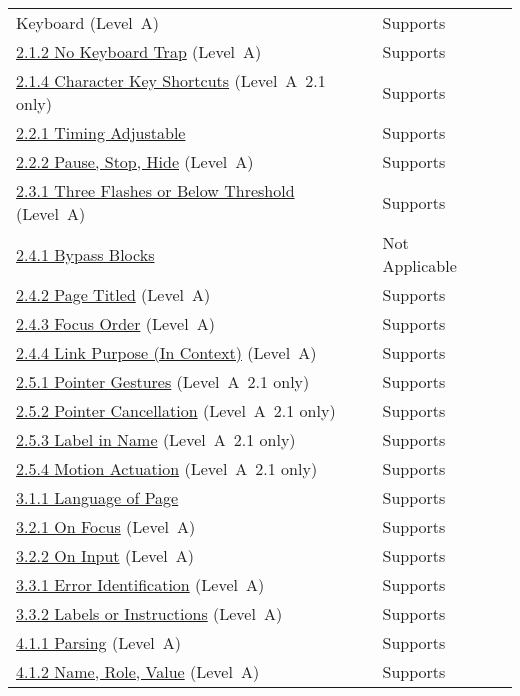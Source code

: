 \documentclass{report}
\begin{document}
\begin{longtable}{p{}<{\RaggedRight}p{}<{\RaggedRight}p{}<{\RaggedRight}}
{  Keyboard} (Level~A) & Supports \\
  \href{http://www.w3.org/TR/WCAG20/#keyboard-operation-trapping}{2.1.2
  No Keyboard Trap} (Level~A) & Supports \\
  \href{https://www.w3.org/TR/WCAG21/#character-key-shortcuts}{2.1.4
  Character Key Shortcuts} (Level~A~2.1 only) & Supports \\
        \href{http://www.w3.org/TR/WCAG20/#time-limits-required-behaviors}{2.2.1
  Timing Adjustable} & Supports\\
  \href{http://www.w3.org/TR/WCAG20/#time-limits-pause}{2.2.2 Pause, Stop,
  Hide} (Level~A) & Supports\\
  \href{http://www.w3.org/TR/WCAG20/#seizure-does-not-violate}{2.3.1
  Three Flashes or Below Threshold} (Level~A) & Supports\\
  \href{http://www.w3.org/TR/WCAG20/#navigation-mechanisms-skip}{2.4.1
  Bypass Blocks} & Not Applicable\\
  \href{http://www.w3.org/TR/WCAG20/#navigation-mechanisms-title}{2.4.2 Page Titled} (Level~A) & Supports\\
  \href{http://www.w3.org/TR/WCAG20/#navigation-mechanisms-focus-order}{2.4.3 Focus Order} (Level~A) & Supports\\
  \href{http://www.w3.org/TR/WCAG20/#navigation-mechanisms-refs}{2.4.4 Link Purpose (In Context)} (Level~A) & Supports\\
  \href{https://www.w3.org/TR/WCAG21/#pointer-gestures}{2.5.1 Pointer Gestures} (Level~A~2.1 only) & Supports\\
  \href{https://www.w3.org/TR/WCAG21/#pointer-cancellation}{2.5.2
  Pointer Cancellation} (Level~A~2.1 only) &  Supports\\
  \href{https://www.w3.org/TR/WCAG21/#label-in-name}{2.5.3 Label in Name} (Level~A~2.1 only) & Supports\\
  \href{https://www.w3.org/TR/WCAG21/#motion-actuation}{2.5.4 Motion Actuation} (Level~A~2.1 only) & Supports\\
  \href{http://www.w3.org/TR/WCAG20/#meaning-doc-lang-id}{3.1.1 Language of Page} & Supports\\
  \href{http://www.w3.org/TR/WCAG20/#consistent-behavior-receive-focus}{3.2.1 On Focus} (Level~A) & Supports\\
  \href{http://www.w3.org/TR/WCAG20/#consistent-behavior-unpredictable-change}{3.2.2 On Input} (Level~A) & Supports\\
  \href{http://www.w3.org/TR/WCAG20/#minimize-error-identified}{3.3.1 Error Identification} (Level~A) & Supports\\
        \href{http://www.w3.org/TR/WCAG20/#minimize-error-cues}{3.3.2 Labels or Instructions} (Level~A) & Supports\\
  \href{http://www.w3.org/TR/WCAG20/#ensure-compat-parses}{4.1.1 Parsing} (Level~A) & Supports\\
  \href{http://www.w3.org/TR/WCAG20/#ensure-compat-rsv}{4.1.2 Name,
  Role, Value} (Level~A) & Supports\\
\end{longtable}
\end{document}
